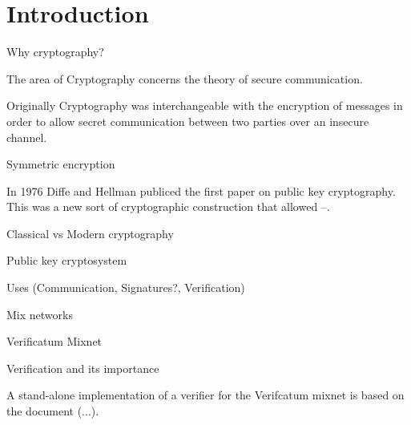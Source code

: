 \section{Introduction}
Why cryptography?

The area of Cryptography concerns the theory of secure communication.

Originally Cryptography was interchangeable with the encryption of
messages in order to allow secret communication between two parties
over an insecure channel.

Symmetric encryption

In 1976 Diffe and Hellman publiced the first paper on public key
cryptography. This was a new sort of cryptographic construction that
allowed --. 

Classical vs Modern cryptography

Public key cryptosystem

Uses (Communication, Signatures?, Verification)

Mix networks

Verificatum Mixnet

Verification and its importance

A stand-alone implementation of a verifier for the Verifcatum mixnet
is based on the document (...).
